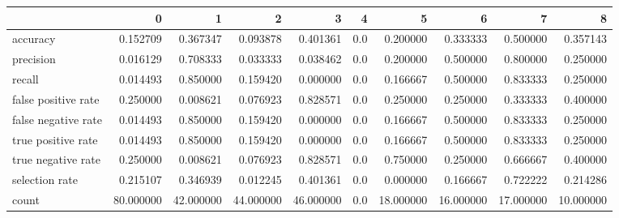 \begin{tabular}{lrrrrrrrrr}
\toprule
{} &          0 &          1 &          2 &          3 &    4 &          5 &          6 &          7 &          8 \\
\midrule
accuracy            &   0.152709 &   0.367347 &   0.093878 &   0.401361 &  0.0 &   0.200000 &   0.333333 &   0.500000 &   0.357143 \\
precision           &   0.016129 &   0.708333 &   0.033333 &   0.038462 &  0.0 &   0.200000 &   0.500000 &   0.800000 &   0.250000 \\
recall              &   0.014493 &   0.850000 &   0.159420 &   0.000000 &  0.0 &   0.166667 &   0.500000 &   0.833333 &   0.250000 \\
false positive rate &   0.250000 &   0.008621 &   0.076923 &   0.828571 &  0.0 &   0.250000 &   0.250000 &   0.333333 &   0.400000 \\
false negative rate &   0.014493 &   0.850000 &   0.159420 &   0.000000 &  0.0 &   0.166667 &   0.500000 &   0.833333 &   0.250000 \\
true positive rate  &   0.014493 &   0.850000 &   0.159420 &   0.000000 &  0.0 &   0.166667 &   0.500000 &   0.833333 &   0.250000 \\
true negative rate  &   0.250000 &   0.008621 &   0.076923 &   0.828571 &  0.0 &   0.750000 &   0.250000 &   0.666667 &   0.400000 \\
selection rate      &   0.215107 &   0.346939 &   0.012245 &   0.401361 &  0.0 &   0.000000 &   0.166667 &   0.722222 &   0.214286 \\
count               &  80.000000 &  42.000000 &  44.000000 &  46.000000 &  0.0 &  18.000000 &  16.000000 &  17.000000 &  10.000000 \\
\bottomrule
\end{tabular}
